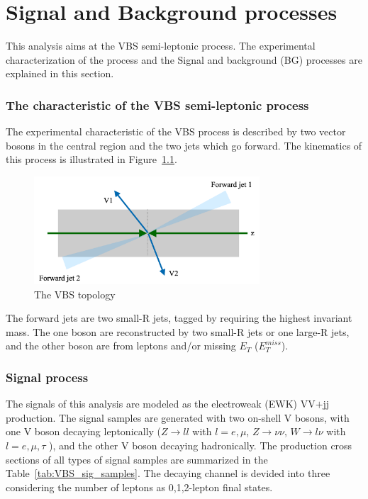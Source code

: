 \chapter{Signal and Background processes}

This analysis aims at the VBS semi-leptonic process. The experimental characterization of the process and the Signal and background (BG) processes are explained in this section.

\subsection{The characteristic of the VBS semi-leptonic process}
The experimental characteristic of the VBS process is described by two vector bosons in the central region and the two jets which go forward.
The kinematics of this process is illustrated in Figure~\ref{fig:VBStopology}.
\begin{figure}[tbp]
\begin{center}
 \includegraphics[width=0.75\textwidth,keepaspectratio]{figures/VBStopology}
\caption{
The VBS topology
}
\label{fig:VBStopology}
\end{center}
\end{figure}

The forward jets are two small-R jets, tagged by requiring the highest invariant mass. The one boson are reconstructed by two small-R jets or one large-R jets, and the other boson are from leptons and/or missing $E_T$ ($E_T^{miss}$).

\subsection{Signal process}

The signals of this analysis are modeled as the electroweak (EWK) VV$\plus$jj production. The signal samples are generated with two on-shell V bosons, with one V boson decaying leptonically ($Z \rightarrow ll$ with $l = e,\mu$, $Z \rightarrow \nu\nu$, $W\rightarrow l\nu$ with $l = e,\mu,\tau$ ), and the other V boson decaying hadronically. The production cross sections of all types of signal samples are summarized in the Table~\ref{tab:VBS_sig_samples}. The decaying channel is devided into three considering the number of leptons as 0,1,2-lepton final states. 

